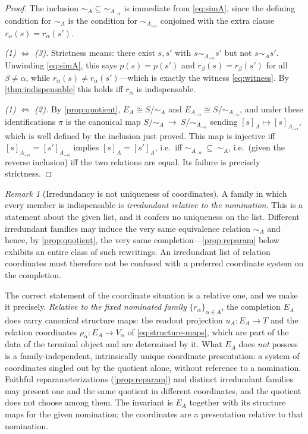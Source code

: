 \documentclass[11pt,reqno]{amsart}
\theoremstyle{plain}
\theoremstyle{definition}
\theoremstyle{remark}
\newtheorem{remark}[theorem]{Remark}
\numberwithin{equation}{section}
\begin{document}
\begin{proof}
The inclusion $\sim_A\subseteq\sim_{A_{-\alpha}}$ is immediate from \eqref{eq:simA}, since the
defining condition for $\sim_A$ is the condition for $\sim_{A_{-\alpha}}$ conjoined with the extra
clause $r_\alpha(s)=r_\alpha(s')$.

\emph{(1) $\Leftrightarrow$ (3).} Strictness means: there exist $s,s'$ with $s\sim_{A_{-\alpha}}s'$
but not $s\sim_A s'$. Unwinding \eqref{eq:simA}, this says $p(s)=p(s')$ and $r_\beta(s)=r_\beta(s')$
for all $\beta\neq\alpha$, while $r_\alpha(s)\neq r_\alpha(s')$---which is exactly the witness
\eqref{eq:witness}. By \cref{thm:indispensable} this holds iff $r_\alpha$ is indispensable.

\emph{(1) $\Leftrightarrow$ (2).} By \cref{prop:quotient}, $E_A\cong S/\!\sim_A$ and
$E_{A_{-\alpha}}\cong S/\!\sim_{A_{-\alpha}}$, and under these identifications $\pi$ is the canonical
map $S/\!\sim_A\ \to\ S/\!\sim_{A_{-\alpha}}$ sending $[s]_A\mapsto[s]_{A_{-\alpha}}$, which is
well defined by the inclusion just proved. This map is injective iff
$[s]_{A_{-\alpha}}=[s']_{A_{-\alpha}}$ implies $[s]_A=[s']_A$, i.e.\ iff
$\sim_{A_{-\alpha}}\ \subseteq\ \sim_A$, i.e.\ (given the reverse inclusion) iff the two relations are
equal. Its failure is precisely strictness.
\end{proof}

\begin{remark}[Irredundancy is not uniqueness of coordinates]
\label{rem:not-unique-coords}
A family in which every member is indispensable is \emph{irredundant relative to the nomination}.
This is a statement about the given list, and it confers no uniqueness on the list. Different
irredundant families may induce the very same equivalence relation $\sim_A$ and hence, by
\cref{prop:quotient}, the very same completion---\cref{prop:reparam} below exhibits an entire class
of such rewritings. An irredundant list of relation coordinates must therefore not be confused with a
preferred coordinate system on the completion.

The correct statement of the coordinate situation is a relative one, and we make it precisely.
\emph{Relative to the fixed nominated family} $\{r_\alpha\}_{\alpha\in A}$, the completion $E_A$ does
carry canonical structure maps: the readout projection $u_A\colon E_A\to T$ and the relation
coordinates $\rho_\alpha\colon E_A\to V_\alpha$ of \eqref{eq:structure-maps}, which are part of the
data of the terminal object and are determined by it. What $E_A$ does \emph{not} possess is a
family-independent, intrinsically unique coordinate presentation: a system of coordinates singled out
by the quotient alone, without reference to a nomination. Faithful reparameterizations
(\cref{prop:reparam}) and distinct irredundant families may present one and the same quotient in
different coordinates, and the quotient does not choose among them. The invariant is $E_A$ together
with its structure maps for the given nomination; the coordinates are a presentation relative to that
nomination.
\end{remark}
\end{document}
